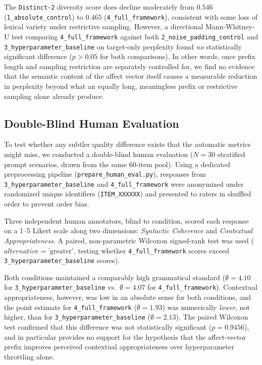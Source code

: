 \documentclass[10pt,twocolumn]{article}
\begin{document}
The \texttt{Distinct-2} diversity score does decline moderately from $0.546$ (\texttt{1\_absolute\_control}) to $0.465$ (\texttt{4\_full\_framework}), consistent with some loss of lexical variety under restrictive sampling. However, a directional Mann-Whitney-U test comparing \texttt{4\_full\_framework} against both \texttt{2\_noise\_padding\_control} and \texttt{3\_hyperparameter\_baseline} on target-only perplexity found \emph{no} statistically significant difference ($p > 0.05$ for both comparisons). In other words, once prefix length and sampling restriction are separately controlled for, we find no evidence that the semantic content of the affect vector itself causes a measurable reduction in perplexity beyond what an equally long, meaningless prefix or restrictive sampling alone already produce.

\subsection{Double-Blind Human Evaluation}
To test whether any subtler quality difference exists that the automatic metrics might miss, we conducted a double-blind human evaluation ($N=30$ stratified prompt scenarios, drawn from the same 60-item pool). Using a dedicated preprocessing pipeline (\texttt{prepare\_human\_eval.py}), responses from \texttt{3\_hyperparameter\_baseline} and \texttt{4\_full\_framework} were anonymized under randomized unique identifiers (\texttt{ITEM\_XXXXXX}) and presented to raters in shuffled order to prevent order bias.

Three independent human annotators, blind to condition, scored each response on a 1--5 Likert scale along two dimensions: \textit{Syntactic Coherence} and \textit{Contextual Appropriateness}. A paired, non-parametric Wilcoxon signed-rank test was used ($alternative=\text{'greater'}$, testing whether \texttt{4\_full\_framework} scores exceed \texttt{3\_hyperparameter\_baseline} scores).

Both conditions maintained a comparably high grammatical standard ($\emptyset=4.10$ for \texttt{3\_hyperparameter\_baseline} vs.\ $\emptyset=4.07$ for \texttt{4\_full\_framework}). Contextual appropriateness, however, was low in an absolute sense for both conditions, and the point estimate for \texttt{4\_full\_framework} ($\emptyset=1.93$) was numerically \emph{lower}, not higher, than for \texttt{3\_hyperparameter\_baseline} ($\emptyset=2.13$). The paired Wilcoxon test confirmed that this difference was not statistically significant ($p = 0.9456$), and in particular provides no support for the hypothesis that the affect-vector prefix improves perceived contextual appropriateness over hyperparameter throttling alone.
\end{document}
